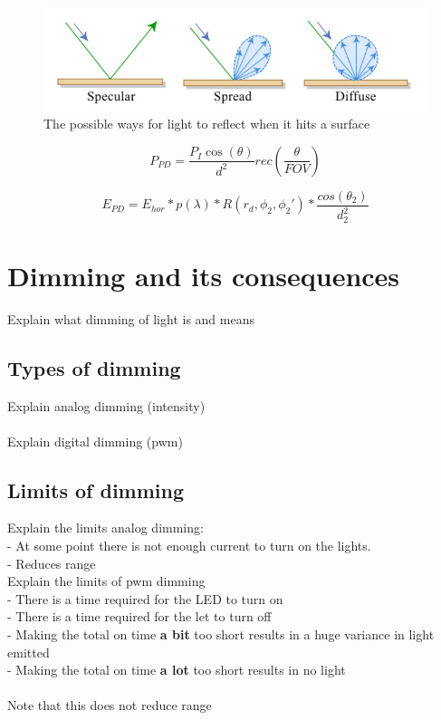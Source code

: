 \begin{figure}
\includegraphics[width=\textwidth]{pics/3_reflections.png}
\caption{The possible ways for light to reflect when it hits a surface \cite{3reflections}}
\label{fig:phong}
\end{figure}

\begin{equation}
\label{eq:PD}
P_{PD}=\frac{P_{I}\cos(\theta)}{d^2} rec \left( \frac{\theta}{FOV} \right)
\end{equation}

\begin{equation}
\label{eq:total}
E_{PD}= E_{hor} * p(\lambda) * R(r_d,\phi_2,\phi_2') * \frac{cos(\theta_2)}{d_2^2}
\end{equation}

\section{Dimming and its consequences}
\label{sec:Dimming and its consequences}

Explain what dimming of light is and means\\

\subsection{Types of dimming}
Explain analog dimming (intensity)\\
\\
Explain digital dimming (pwm)\\

\subsection{Limits of dimming}
Explain the limits analog dimming:\\
   - At some point there is not enough current to turn on the lights.\\
   - Reduces range\\
Explain the limits of pwm dimming\\
   - There is a time required for the LED to turn on\\
   - There is a time required for the let to turn off\\
   - Making the total on time \textbf{a bit} too short results in a huge variance in light emitted\\
   - Making the total on time \textbf{a lot} too short results in no light\\
   \\
   Note that this does not reduce range
   
